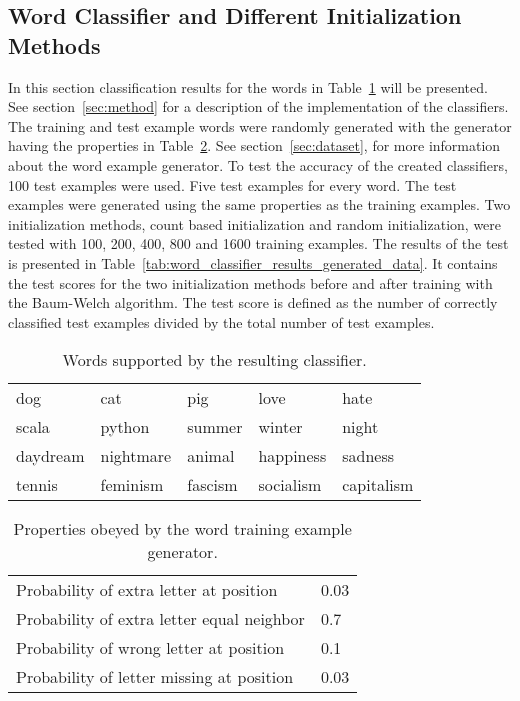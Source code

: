 \subsection{Word Classifier and Different Initialization Methods}

In this section classification results for the words in Table~\ref{tab:words_supported_by_classifier} will be presented. See section~\ref{sec:method} for a description of the implementation of the classifiers. The training and test example words were randomly generated with the generator having the properties in Table~\ref{tab:word_generator_properties}. See section~\ref{sec:dataset}, for more information about the word example generator. To test the accuracy of the created classifiers, 100 test examples were used. Five test examples for every word. The test examples were generated using the same properties as the training examples. Two initialization methods, count based initialization and random initialization, were tested with 100, 200, 400, 800 and 1600 training examples. The results of the test is presented in Table~\ref{tab:word_classifier_results_generated_data}. It contains the test scores for the two initialization methods before and after training with the Baum-Welch algorithm. The test score is defined as the number of correctly classified test examples divided by the total number of test examples.

\begin{table}[htb]
  \begin{center}
  \begin{tabular}{ l l l l l }
    dog      & cat       & pig     & love       & hate  \\
    scala    & python    & summer  & winter     & night  \\ 
    daydream & nightmare & animal  & happiness  & sadness \\ 
    tennis   & feminism  & fascism & socialism  & capitalism \\
  \end{tabular}
\end{center}
\caption{Words supported by the resulting classifier.} 
\label{tab:words_supported_by_classifier} 
\end{table}

\begin{table}[htb]
  \begin{center}
  \begin{tabular}{ l l }
    Probability of extra letter at position         & 0.03 \\
    Probability of extra letter equal neighbor      & 0.7 \\ 
    Probability of wrong letter at position         & 0.1 \\ 
    Probability of letter missing at position       & 0.03 \\
  \end{tabular}
\end{center}
\caption{Properties obeyed by the word training example generator.} 
\label{tab:word_generator_properties} 
\end{table}

